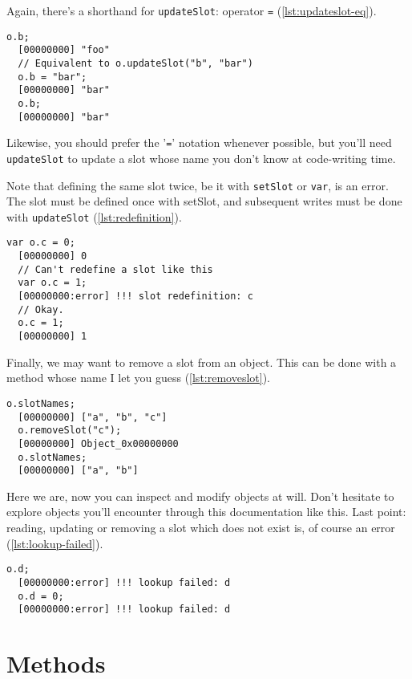 \documentclass[openright,twoside,12pt]{report}
\newcommand{\lst}[1]{\autoref{lst:#1}}
\begin{document}
Again, there's a shorthand for \texttt{updateSlot}: operator
\texttt{=} (\lst{updateslot-eq}).

\begin{lstlisting}[caption=Updating a slot with '\texttt{=}',
  label=lst:updateslot-eq]
  o.b;
  [00000000] "foo"
  // Equivalent to o.updateSlot("b", "bar")
  o.b = "bar";
  [00000000] "bar"
  o.b;
  [00000000] "bar"
\end{lstlisting}

Likewise, you should prefer the '\texttt{=}' notation whenever
possible, but you'll need \texttt{updateSlot} to update a slot whose
name you don't know at code-writing time.

Note that defining the same slot twice, be it with \texttt{setSlot} or
\texttt{var}, is an error. The slot must be defined once with setSlot,
and subsequent writes must be done with \texttt{updateSlot}
(\lst{redefinition}).

\begin{lstlisting}[caption=Defining a slot twice is an error,
  label=lst:redefinition]
  var o.c = 0;
  [00000000] 0
  // Can't redefine a slot like this
  var o.c = 1;
  [00000000:error] !!! slot redefinition: c
  // Okay.
  o.c = 1;
  [00000000] 1
\end{lstlisting}

Finally, we may want to remove a slot from an object. This can be done
with a method whose name I let you guess (\lst{removeslot}).

\begin{lstlisting}[caption=Removing a slot, label=lst:removeslot]
  o.slotNames;
  [00000000] ["a", "b", "c"]
  o.removeSlot("c");
  [00000000] Object_0x00000000
  o.slotNames;
  [00000000] ["a", "b"]
\end{lstlisting}

Here we are, now you can inspect and modify objects at will. Don't
hesitate to explore \urbi objects you'll encounter through this
documentation like this. Last point: reading, updating or removing a
slot which does not exist is, of course an error
(\lst{lookup-failed}).

\begin{lstlisting}[caption=Manipulating existent slot is an error,
  label=lst:lookup-failed]
  o.d;
  [00000000:error] !!! lookup failed: d
  o.d = 0;
  [00000000:error] !!! lookup failed: d
\end{lstlisting}

\section{Methods}
\end{document}
